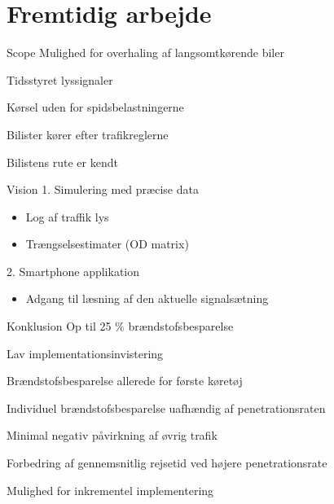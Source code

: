 \section{Fremtidig arbejde}
\begin{frame}{Scope}
Mulighed for overhaling af langsomtkørende biler
\vspace{4mm}

Tidsstyret lyssignaler
\vspace{4mm}

Kørsel uden for spidsbelastningerne
\vspace{4mm}

Bilister kører efter trafikreglerne

\vspace{4mm}
Bilistens rute er kendt

\end{frame}

\begin{frame}{Vision}
1. Simulering med præcise data
	\begin{itemize}
	\item Log af traffik lys
	\item Trængselsestimater (OD matrix)
	\end{itemize}

2. Smartphone applikation
	\begin{itemize}
	\item Adgang til læsning af den aktuelle signalsætning
	\end{itemize}

\end{frame}

\begin{frame}{Konklusion}
Op til 25 \% brændstofsbesparelse
\vspace{4mm}

Lav implementationsinvistering
\vspace{4mm}

Brændstofsbesparelse allerede for første køretøj
\vspace{4mm}

Individuel brændstofsbesparelse uafhændig af penetrationsraten
\vspace{4mm}

Minimal negativ påvirkning af øvrig trafik
\vspace{4mm}

Forbedring af gennemsnitlig rejsetid ved højere penetrationsrate
\vspace{4mm}

Mulighed for inkrementel implementering
\end{frame}
